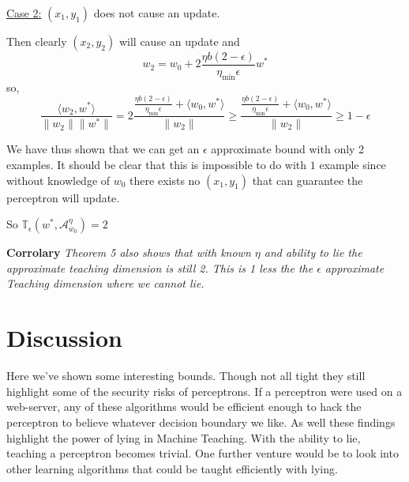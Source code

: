 \documentclass{article}
\newcommand{\learn}{\mathcal{A}_{w_0}^\eta}
\begin{document}
\underline{Case 2:} $(x_1, y_1)$ does not cause an update.

Then clearly $(x_2, y_2)$ will cause an update and
$$
w_2 = w_0 + 2\frac{\eta b(2-\epsilon)}{\eta_{\min} \epsilon}w^* 
$$
so,
$$
\frac{\langle w_2 , w^* \rangle}{\lVert w_2 \rVert \lVert w^* \rVert} = 2\frac{\frac{\eta b(2-\epsilon)}{\eta_{\min} \epsilon} + \langle w_0, w^* \rangle}{\lVert w_2 \rVert} \geq \frac{\frac{\eta b(2-\epsilon)}{\eta_{\min} \epsilon} + \langle w_0, w^* \rangle}{\lVert w_2 \rVert} \geq 1 - \epsilon
$$

We have thus shown that we can get an $\epsilon$ approximate bound with only 2 examples. It should be clear that this is impossible to do with $1$ example since without knowledge of $w_0$ there exists no $(x_1, y_1)$ that can guarantee the perceptron will update.

So 
$
\mathbb{T}_{\epsilon}(w^*, \learn) = 2
$

\textbf{Corrolary}
\textit{
Theorem 5 also shows that with known $\eta$ and ability to lie the approximate teaching dimension is still 2. This is 1 less the the $\epsilon$ approximate Teaching dimension where we cannot lie. \cite{perceptron}
}

\section{Discussion}
Here we've shown some interesting bounds. Though not all tight they still highlight some of the security risks of perceptrons. If a perceptron were used on a web-server, any of these algorithms would be efficient enough to hack the perceptron to believe whatever decision boundary we like. As well these findings highlight the power of lying in Machine Teaching. With the ability to lie, teaching a perceptron becomes trivial. One further venture would be to look into other learning algorithms that could be taught efficiently with lying. 


\small


\end{document}
